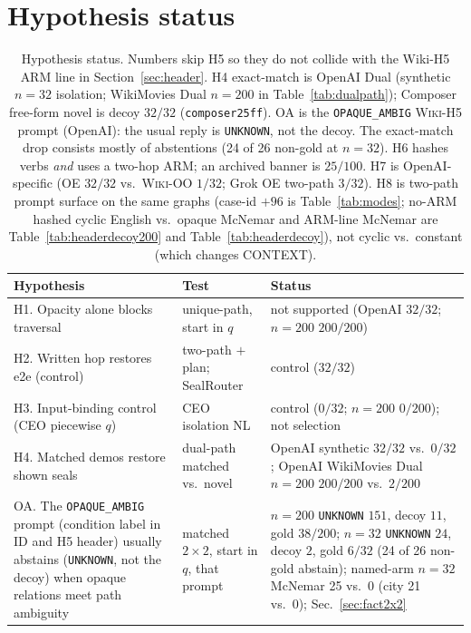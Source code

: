 \documentclass[10pt]{article} %
\begin{document}
\section{Hypothesis status}
\label{app:hyp}

\begin{table}[h]
\centering
\footnotesize
\setlength{\tabcolsep}{4pt}

\caption{Hypothesis status. Numbers skip H5 so they do not collide with the
Wiki-H5 ARM line in Section~\ref{sec:header}.
H4 exact-match is OpenAI Dual (synthetic $n{=}32$ isolation; WikiMovies Dual
$n{=}200$ in Table~\ref{tab:dualpath}); Composer free-form
novel is decoy $32/32$ (\texttt{composer25ff}). OA is the \texttt{OPAQUE\_AMBIG}
\textsc{Wiki-H5} prompt (OpenAI): the usual reply is \texttt{UNKNOWN}, not the decoy.
The exact-match drop consists mostly of abstentions (24 of 26 non-gold at
$n{=}32$).
H6 hashes verbs \emph{and} uses a two-hop ARM; an archived banner
is $25/100$. H7 is OpenAI-specific (OE $32/32$ vs.\ \textsc{Wiki-OO} $1/32$;
Grok OE two-path $3/32$).
H8 is two-path prompt surface on the same graphs
(case-id ${+}96$ is Table~\ref{tab:modes};
no-ARM hashed cyclic English vs.\ opaque McNemar and ARM-line McNemar
are Table~\ref{tab:headerdecoy200} and Table~\ref{tab:headerdecoy}),
not cyclic vs.\ constant (which changes CONTEXT).}
\label{tab:hyp}
\begin{tabularx}{\linewidth}{@{}
  >{\raggedright\arraybackslash}p{4.05cm}
  >{\raggedright\arraybackslash}X
  >{\raggedright\arraybackslash}p{4.05cm}@{}}
\toprule
Hypothesis & Test & Status \\
\midrule
H1. Opacity alone blocks traversal & unique-path, start in $q$ & not supported (OpenAI $32/32$; $n{=}200$ $200/200$) \\
H2. Written hop restores e2e (control) & two-path $+$ plan; SealRouter & control ($32/32$) \\
H3. Input-binding control (CEO piecewise $q$) & CEO isolation NL & control ($0/32$; $n{=}200$ $0/200$); not selection \\
H4. Matched demos restore shown seals & dual-path matched vs.\ novel & OpenAI synthetic $32/32$ vs.\ $0/32$; OpenAI WikiMovies Dual $n{=}200$ $200/200$ vs.\ $2/200$ \\
OA. The \texttt{OPAQUE\_AMBIG} prompt (condition label in ID and H5 header) usually abstains (\texttt{UNKNOWN}, not the decoy) when opaque relations meet path ambiguity & matched $2{\times}2$, start in $q$, that prompt & $n{=}200$ \texttt{UNKNOWN} $151$, decoy $11$, gold $38/200$; $n{=}32$ \texttt{UNKNOWN} $24$, decoy $2$, gold $6/32$ (24 of 26 non-gold abstain); named-arm $n{=}32$ McNemar 25 vs.\ 0 (city 21 vs.\ 0); Sec.~\ref{sec:fact2x2} \\

\end{tabularx}
\end{table}
\end{document}

